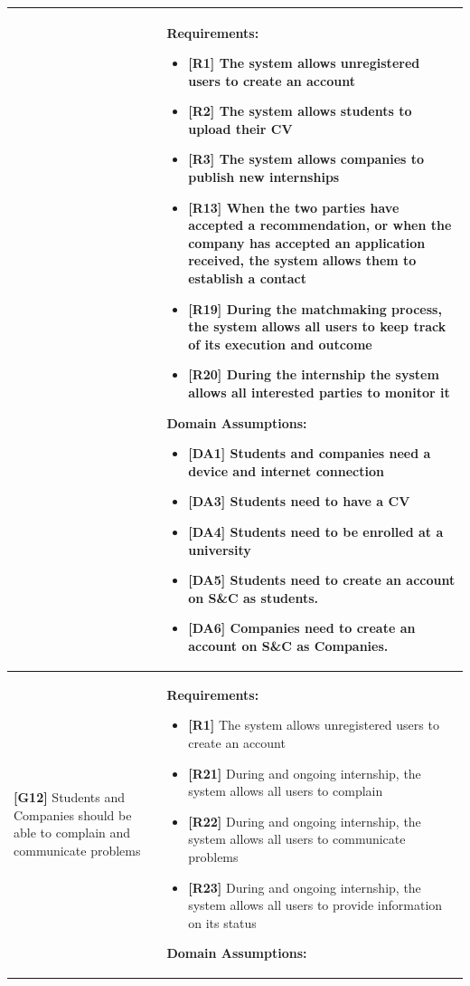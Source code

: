\begin{longtable}{|p{}|p{}|}
& 
\textbf{Requirements:}
\begin{itemize}
    \item \textbf{[R1]} The system allows unregistered users to create an account
    \item \textbf{[R2]} The system allows students to upload their CV
    \item \textbf{[R3]} The system allows companies to publish new internships
    \item \textbf{[R13]} When the two parties have accepted a recommendation, or when the company has accepted an application received, the system allows them to establish a contact
    \item \textbf{[R19]} During the matchmaking process, the system allows all users to keep track of its execution and outcome
    \item \textbf{[R20]} During the internship the system allows all interested parties to monitor it
\end{itemize}
\textbf{Domain Assumptions:}
\begin{itemize}
     \item \textbf{[DA1]} Students and companies need a device and internet connection
     \item \textbf{[DA3]} Students need to have a CV
     \item \textbf{[DA4]} Students need to be enrolled at a university
    \item \textbf{[DA5]} Students need to create an account on S\&C as students.
    \item \textbf{[DA6]} Companies need to create an account on S\&C as Companies.
\end{itemize} \\
\hline
\textbf{[G12]} Students and Companies should be able to complain and communicate problems
& 
\textbf{Requirements:}
\begin{itemize}
    \item \textbf{[R1]} The system allows unregistered users to create an account
    \item \textbf{[R21]} During and ongoing internship, the system allows all users to complain
    \item \textbf{[R22]} During and ongoing internship, the system allows all users to communicate problems
    \item \textbf{[R23]} During and ongoing internship, the system allows all users to provide information on its status
\end{itemize}
\textbf{Domain Assumptions:}

\end{longtable}

